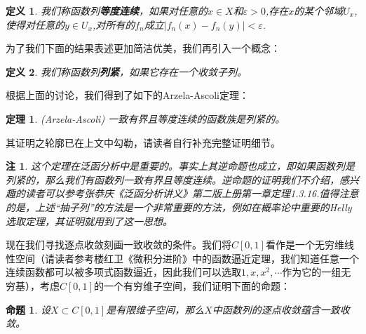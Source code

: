 \documentclass{article}
\newtheorem{definition}{定义}[subsection]
\newtheorem{theorem}{定理}[subsection]
\newtheorem{proposition}{命题}[subsection]
\newtheorem{note}{注}[subsection]
\begin{document}
\begin{definition}
我们称函数列\textbf{等度连续}，如果对任意的$x\in X$和$\varepsilon>0$,存在$x$的某个邻域$U_x$,使得对任意的$y\in U_x$,对所有的$f_n$成立$|f_n(x)-f_n(y)|<\varepsilon$.
\end{definition}
为了我们下面的结果表述更加简洁优美，我们再引入一个概念：
\begin{definition}
我们称函数列\textbf{列紧}，如果它存在一个收敛子列。
\end{definition}
根据上面的讨论，我们得到了如下的Arzela-Ascoli定理：
\begin{theorem}(Arzela-Ascoli)
一致有界且等度连续的函数族是列紧的。
\end{theorem}
其证明之轮廓已在上文中勾勒，请读者自行补充完整证明细节。
\begin{note}
这个定理在泛函分析中是重要的。事实上其逆命题也成立，即如果函数列是列紧的，那么我们有函数列一致有界且等度连续。逆命题的证明我们不介绍，感兴趣的读者可以参考张恭庆《泛函分析讲义》第二版上册第一章定理1.3.16.值得注意的是，上述“抽子列”的方法是一个非常重要的方法，例如在概率论中重要的Helly选取定理，其证明就用到了这一思想。
\end{note}
现在我们寻找逐点收敛刻画一致收敛的条件。我们将$C[0,1]$看作是一个无穷维线性空间（请读者参考楼红卫《微积分进阶》中的函数逼近定理，我们知道任意一个连续函数都可以被多项式函数逼近，因此我们可以选取$1,x,x^2,\cdots$作为它的一组无穷基），考虑$C[0,1]$的一个有穷维子空间，我们证明下面的命题：
\begin{proposition}
设$X\subset C[0,1]$是有限维子空间，那么$X$中函数列的逐点收敛蕴含一致收敛。
\end{proposition}
\end{document}
